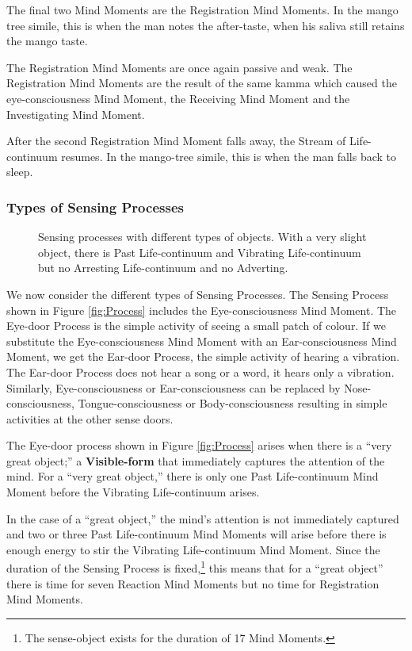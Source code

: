 The final two Mind Moments are the Registration Mind Moments. In the mango tree simile, this is when the man notes the after-taste, when his saliva still retains the mango taste.

The Registration Mind Moments are once again passive and weak. The Registration Mind Moments are the result of the same kamma which caused the eye-consciousness Mind Moment, the Receiving Mind Moment and the Investigating Mind Moment.

After the second Registration Mind Moment falls away, the Stream of Life-continuum resumes. In the mango-tree simile, this is when the man falls back to sleep.

\subsubsection*{Types of Sensing Processes}

\begin{figure}[h]
\centering

\caption{Sensing processes with different types of objects. With a very slight object, there is Past Life-continuum and Vibrating Life-continuum but no Arresting Life-continuum and no Adverting.}
\label{fig:Process1}
\end{figure}

We now consider the different types of Sensing Processes. The Sensing Process shown in Figure \ref{fig:Process} includes the Eye-consciousness Mind Moment. The Eye-door Process is the simple activity of seeing a small patch of colour. If we substitute the Eye-consciousness Mind Moment with an Ear-consciousness Mind Moment, we get the Ear-door Process, the simple activity of hearing a vibration. The Ear-door Process does not hear a song or a word, it hears only a vibration. Similarly, Eye-consciousness or Ear-consciousness can be replaced by Nose-consciousness, Tongue-consciousness or Body-consciousness resulting in simple activities at the other sense doors.

The Eye-door process shown in Figure \ref{fig:Process} arises when there is a “very great object;” a \textbf{Visible-form} that immediately captures the attention of the mind. For a “very great object,” there is only one Past Life-continuum Mind Moment before the Vibrating Life-continuum arises. 

\pagebreak

In the case of a “great object,” the mind’s attention is not immediately captured and two or three Past Life-continuum Mind Moments will arise before there is enough energy to stir the Vibrating Life-continuum Mind Moment. Since the duration of the Sensing Process is fixed,\footnote{The sense-object exists for the duration of 17 Mind Moments.} this means that for a “great object” there is time for seven Reaction Mind Moments but no time for Registration Mind Moments.

